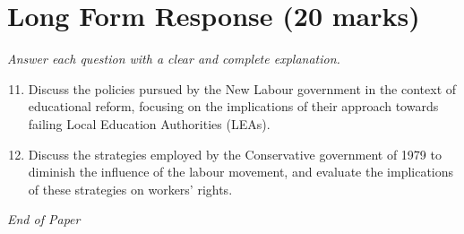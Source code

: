 \documentclass[12pt]{article}
\begin{document}
\section*{Long Form Response (20 marks)}
\textit{Answer each question with a clear and complete explanation.}
\begin{enumerate}[label=\arabic*.]
\setcounter{enumi}{10}
\item Discuss the policies pursued by the New Labour government in the context of educational reform, focusing on the implications of their approach towards failing Local Education Authorities (LEAs).
\item Discuss the strategies employed by the Conservative government of 1979 to diminish the influence of the labour movement, and evaluate the implications of these strategies on workers' rights.
\end{enumerate}

\vfill
\noindent\textit{End of Paper}
\end{document}
